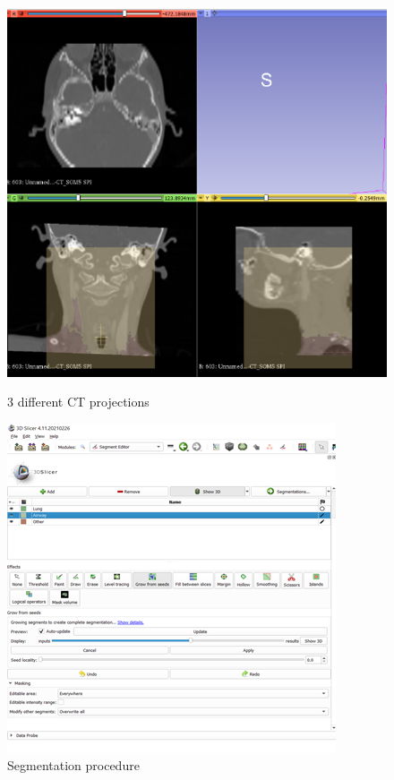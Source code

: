 \documentclass[MME,Projekt,english]{twbook}%
\begin{document}
\begin{figure}[!htb]
	\begin{minipage}{0.48\textwidth}
		\centering
		\includegraphics[width=.7\linewidth]{images/existing-evaluation/1-different-ct-projections}
		\caption{3 different CT projections}\label{1-different-ct-projections}
	\end{minipage}\hfill
	\begin{minipage}{0.48\textwidth}
		\centering
		\includegraphics[width=.7\linewidth]{images/existing-evaluation/2-segmentation-procedure}
		\caption{Segmentation procedure}\label{2-segmentation-procedure}
	\end{minipage}
\end{figure}
\end{document}
